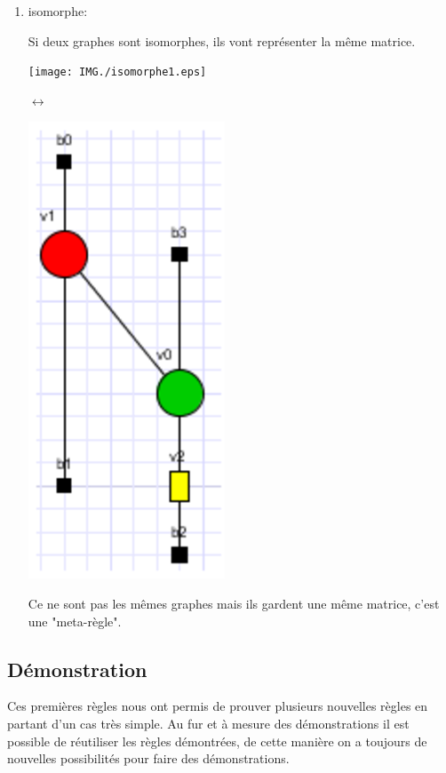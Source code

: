 \documentclass[a4paper,oneside]{book}
\begin{document}
\begin{enumerate}
\item isomorphe:

Si deux graphes sont isomorphes, ils vont représenter la même matrice.

\begin{center}
\begin{minipage}[c]{0.25\textwidth}
\flushright\texttt{[image: IMG./isomorphe1.eps]}
\end{minipage}
\hspace{0.5cm}\Huge{$\longleftrightarrow$}
\begin{minipage}[c]{0.25\textwidth}
\includegraphics[scale=0.7]{IMG/isomorphe2.eps}
\end{minipage}
\label{isomorphe}
\end{center}

Ce ne sont pas les mêmes graphes mais ils gardent une même matrice, c'est une "meta-règle".

\end{enumerate}

\subsection{Démonstration}
Ces premières règles nous ont permis de prouver plusieurs nouvelles règles en partant d'un cas très simple. Au fur et à mesure des démonstrations il est possible de réutiliser les règles démontrées, de cette manière on a toujours de nouvelles possibilités pour faire des démonstrations.
\end{document}

